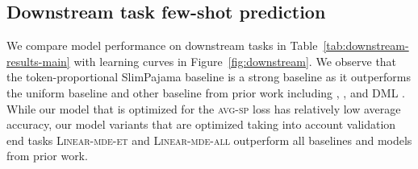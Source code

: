 \subsection{Downstream task few-shot prediction}



We compare model performance on downstream tasks in Table~\ref{tab:downstream-results-main} with learning curves in Figure~\ref{fig:downstream}.
We observe that the token-proportional SlimPajama baseline is a strong baseline as it outperforms the uniform baseline and other baseline from prior work including {\doge}, {\doremi}, and DML \cite{dml}.
While our model that is optimized for the  \textsc{avg-sp} loss has relatively low average accuracy, our model variants that are optimized taking into account validation end tasks \textsc{Linear-mde-et} and \textsc{Linear-mde-all} outperform all baselines and models from prior work.








